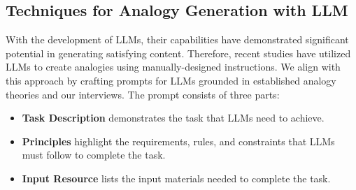 \subsection{Techniques for Analogy Generation with LLM}
\label{sec:Techniques for Analogy Generation with LLM}


With the development of LLMs, their capabilities have demonstrated significant potential in generating satisfying content.
Therefore, recent studies have utilized LLMs to create analogies using manually-designed instructions. 
We align with this approach by crafting prompts for LLMs grounded in established analogy theories and our interviews.
The prompt consists of three parts:
\begin{itemize}
    \item \textbf{Task Description} demonstrates the task that LLMs need to achieve.
    \item \textbf{Principles} highlight the requirements, rules, and constraints that LLMs must follow to complete the task.
    \item \textbf{Input Resource} lists the input materials needed to complete the task.
\end{itemize}

